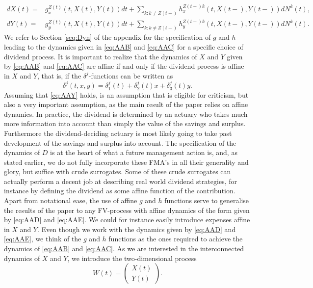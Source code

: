 \documentclass[12pt]{article}
\theoremstyle{my_thm}
\begin{document}
\begin{align}
dX(t)=&g^{Z(t)}_{x}(t,X(t),Y(t))dt + \sum_{k:k \neq Z(t-)}  h^{Z(t-)k}_{x}(t,X(t-),Y(t-)) dN^k(t),
\label{eq:AAD}
\\
dY(t)=&g^{Z(t)}_{y}(t,X(t),Y(t))dt + \sum_{k:k \neq Z(t-)} h^{Z(t-)k}_{y}(t,X(t-), Y(t-)) dN^k(t)
\label{eq:AAE}.
\end{align}
We refer to Section \ref{seq:Dyn} of the appendix for the specification of $g$ and $h$ leading to the dynamics given in \eqref{eq:AAB} and \eqref{eq:AAC} for a specific choice of dividend process. It is important to realize that the dynamics of $X$ and $Y$ given by \eqref{eq:AAB} and \eqref{eq:AAC} are affine if and only if the dividend process is affine in $X$ and $Y$, that is, if the $\delta^j$-functions can be written as
\begin{equation}
\delta^j(t,x,y)=\delta_1^j(t)+\delta_2^j(t)x+\delta_3^j(t)y. \label{eq:AAY}
\end{equation}
Assuming that \eqref{eq:AAY} holds, is an assumption that is eligible for criticism, but also a very important assumption, as the main result of the paper relies on affine dynamics. In practice, the dividend is determined by an actuary who takes much more information into account than simply the value of the savings and surplus. Furthermore the dividend-deciding actuary is most likely going to take past development of the savings and surplus into account. The specification of the dynamics of $D$ is at the heart of what a future management action is, and, as stated earlier, we do not fully incorporate these FMA's in all their generality and glory, but suffice with crude surrogates. Some of these crude surrogates can actually perform a decent job at describing real world dividend strategies, for instance by defining the dividend as some affine function of the contribution.
\\[12pt]
Apart from notational ease, the use of affine $g$ and $h$ functions serve to generalise the results of the paper to any FV-process with affine dynamics of the form given by \eqref{eq:AAD} and \eqref{eq:AAE}. We could for instance easily introduce expenses affine in $X$ and $Y$. Even though we work with the dynamics given by \eqref{eq:AAD} and \eqref{eq:AAE}, we think of the $g$ and $h$ functions as the ones required to achieve the dynamics of \eqref{eq:AAB} and \eqref{eq:AAC}. As we are interested in the interconnected dynamics of $X$ and $Y$, we introduce the two-dimensional process 
$$
W(t)= \begin{pmatrix}
X(t)\\
Y(t)
\end{pmatrix}.
$$
\end{document}
